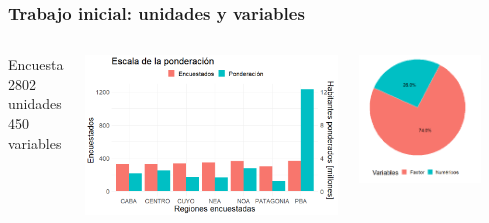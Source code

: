 \documentclass[10pt]{beamer}
\begin{document}
\begin{frame}
  \frametitle{Trabajo inicial: unidades y variables}

  \begin{columns}
      Encuesta\\
      2802 unidades\\
      450 variables

      \includegraphics[width=\textwidth]{pondera}

      \includegraphics[width=0.8\textwidth]{tipos_variables}
  \end{columns}

  \vfill


\end{frame}
\end{document}
